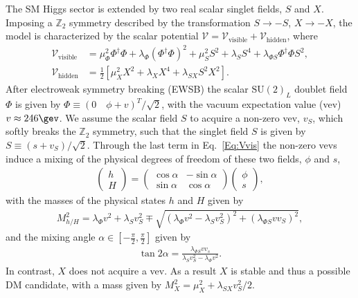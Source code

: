 \documentclass[../report.tex]{subfiles}
\begin{document}
The SM Higgs sector is extended by two real scalar singlet fields, $S$ and $X$. Imposing a $\mathbb{Z}_2$ symmetry described by the transformation $S\to -S$, $X\to -X$, the model is characterized by the scalar potential $\mathcal{V} = \mathcal{V}_\mathrm{visible}  + \mathcal{V}_\mathrm{hidden}$, where
\begin{align}
\label{Eq:Vvis}\mathcal{V}_\mathrm{visible} &=   \mu_{\Phi}^2 \Phi^\dagger \Phi + \lambda_\Phi (\Phi^\dagger \Phi)^2 + \mu_S^2 S^2 + \lambda_S S^4 + \lambda_{\Phi S} \Phi^\dagger \Phi S^2,\\
\label{Eq:Vhid} \mathcal{V}_\mathrm{hidden} &= \frac{1}{2}\left[\mu^2_{X} X^2 + \lambda_X X^4 + \lambda_{SX} S^2 X^2\right]. 
\end{align}
After electroweak symmetry breaking (EWSB) the scalar $\mathrm{SU}(2)_L$ doublet field $\Phi$ is given by 
$\Phi \equiv \left(0 \quad \phi + v\right)^T/\sqrt{2}$, with the vacuum expectation value (vev) $v \approx 246\gev$. 
We assume the scalar field $S$ to acquire a non-zero vev, $v_S$, which softly breaks the $\mathbb{Z}_2$ symmetry, such that the singlet field $S$ is given by $S \equiv (s + v_S)/\sqrt{2}$. Through the last term in Eq.~\eqref{Eq:Vvis} the non-zero vevs induce a mixing of the physical degrees of freedom of these two fields, $\phi$ and $s$,
\begin{align}
\begin{pmatrix} h \\ H \end{pmatrix} = \begin{pmatrix} \cos \alpha & -\sin\alpha \\ \sin\alpha & \cos\alpha \end{pmatrix} \begin{pmatrix} \phi \\ s \end{pmatrix},
\end{align}
with the masses of the physical states $h$ and $H$ given by
\begin{align}
M_{h/H}^2 = \lambda_\Phi v^2 + \lambda_S v_S^2 \mp \sqrt{\left(\lambda_\Phi v^2 - \lambda_S v_S^2\right)^2 + \left(\lambda_{\Phi S} v v_S\right)^2},
\end{align}
and the mixing angle $\alpha \in [-\tfrac{\pi}{2}, \tfrac{\pi}{2}]$ given by
\begin{align}
\tan 2\alpha = \frac{\lambda_{\Phi S} v v_s}{\lambda_S v_S^2 - \lambda_\Phi v^2}.
\end{align}
In contrast, $X$ does not acquire a vev. As a result $X$ is stable and thus a possible DM candidate, with a mass given by
$M_X^2  = \mu_X^2  + \lambda_{SX} v_S^2/2$.
\end{document}
